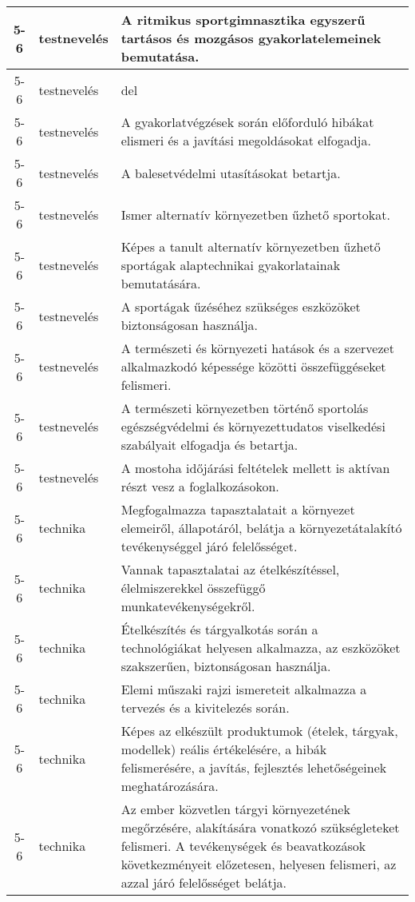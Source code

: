 \begin{small}
\begin{longtable}{c | p{2cm} |  p{11cm} }
              5-6 & testnevelés & A ritmikus sportgimnasztika egyszerű tartásos és mozgásos gyakorlatelemeinek bemutatása. \\ \hline
              5-6 & testnevelés & del
 \\ \hline
              5-6 & testnevelés & A gyakorlatvégzések során előforduló hibákat elismeri és a javítási megoldásokat elfogadja. \\ \hline
              5-6 & testnevelés & A balesetvédelmi utasításokat betartja. \\ \hline
              5-6 & testnevelés & Ismer alternatív környezetben űzhető sportokat. \\ \hline
              5-6 & testnevelés & Képes a tanult alternatív környezetben űzhető sportágak alaptechnikai gyakorlatainak bemutatására. \\ \hline
              5-6 & testnevelés & A sportágak űzéséhez szükséges eszközöket biztonságosan használja. \\ \hline
              5-6 & testnevelés & A természeti és környezeti hatások és a szervezet alkalmazkodó képessége közötti összefüggéseket felismeri. \\ \hline
              5-6 & testnevelés & A természeti környezetben történő sportolás egészségvédelmi és környezettudatos viselkedési szabályait elfogadja és betartja. \\ \hline
              5-6 & testnevelés & A mostoha időjárási feltételek mellett is aktívan részt vesz a foglalkozásokon. \\ \hline
              5-6 & technika & Megfogalmazza tapasztalatait a környezet elemeiről, állapotáról, belátja a környezetátalakító tevékenységgel járó felelősséget. \\ \hline
              5-6 & technika & Vannak tapasztalatai az ételkészítéssel, élelmiszerekkel összefüggő munkatevékenységekről. \\ \hline
              5-6 & technika & Ételkészítés és tárgyalkotás során a technológiákat helyesen alkalmazza, az eszközöket szakszerűen, biztonságosan használja. \\ \hline
              5-6 & technika & Elemi műszaki rajzi ismereteit alkalmazza a tervezés és a kivitelezés során. \\ \hline
              5-6 & technika & Képes az elkészült produktumok (ételek, tárgyak, modellek) reális értékelésére, a hibák felismerésére, a javítás, fejlesztés lehetőségeinek meghatározására. \\ \hline
              5-6 & technika & Az ember közvetlen tárgyi környezetének megőrzésére, alakítására vonatkozó szükségleteket felismeri. A tevékenységek és beavatkozások következményeit előzetesen, helyesen felismeri, az azzal járó felelősséget belátja. \\ \hline

\end{longtable}
\end{small}
